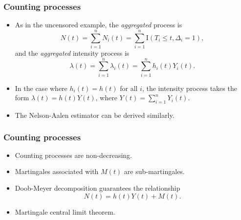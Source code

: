 \documentclass[10pt]{beamer}\usepackage[]{graphicx}\usepackage[]{color}
\newcommand{\empr}[1]{{\emph{\color{red}#1}}}
\newcommand{\I}{\mathrm{I}}
\begin{document}
\begin{frame}
  \frametitle{Counting processes}
  \begin{itemize}  
  \item As in the uncensored example, the \empr{aggregated} process is
    $$N(t) = \sum_{i = 1}^nN_i(t)= \sum_{i = 1}^n\I(T_i\le t, \Delta_i = 1),$$
    and the \empr{aggregated} intensity process is 
    $$ \lambda(t) = \sum_{i = 1}^n\lambda_i(t) = \sum_{i = 1}^nh_i(t)Y_i(t). $$
  \item In the case where $h_i(t) = h(t)$ for all $i$, 
    the intensity process takes the form $\lambda(t) = h(t)Y(t)$,
    where $Y(t) = \sum_{i = 1}^nY_i(t)$.
  \item The Nelson-Aalen estimator can be derived similarly.
  \end{itemize}
\end{frame} 

\begin{frame}
  \frametitle{Counting processes}
  \begin{itemize}  
  \item Counting processes are non-decreasing.
  \item Martingales associated with $M(t)$ are sub-martingales.
  \item Doob-Meyer decomposition guarantees the relationship 
    $$ N(t) = h(t)Y(t) + M(t).$$
  \item Martingale central limit theorem.
  \end{itemize}
\end{frame} 
\end{document}
